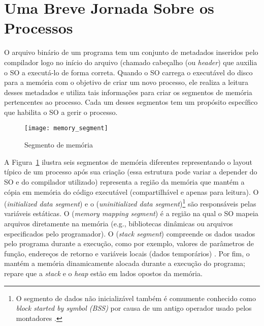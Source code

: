 \section{Uma Breve Jornada Sobre os Processos}
\label{sec:processos-e-threads}


O arquivo binário de um programa tem um conjunto de metadados inseridos pelo
compilador logo no início do arquivo (chamado cabeçalho (ou \textit{header})
que auxilia o SO a executá-lo de forma correta.  Quando o SO carrega o
executável do disco para a memória com o objetivo de criar um novo processo,
ele realiza a leitura desses metadados e utiliza tais informações para criar os
segmentos de memória pertencentes ao processo. Cada um desses segmentos tem um
propósito específico que habilita o SO a gerir o processo.

\begin{figure}[!h]
  \centering
  \texttt{[image: memory\_segment]} 
  \caption{Segmento de memória}
  \label{fig:memory_segment} 
\end{figure}

A Figura~\ref{fig:memory_segment} ilustra seis segmentos de memória diferentes
representando o layout típico de um processo após sua criação (essa estrutura
pode variar a depender do SO e do compilador utilizado) representa a região da
memória que mantém a cópia em memória do código executável (compartilhável e
apenas para leitura). O 
(\emph{initialized data segment}) e o  (\emph{uninitialized data segment})\footnote{O segmento de dados
não inicializável também é comumente conhecido como \emph{block started by
symbol (BSS)} por causa de um antigo operador usado pelos montadores
\citep{gdb}.} são responsáveis pelas variáveis estáticas. O
 (\emph{memory mapping
segment}) é a região na qual o SO mapeia arquivos diretamente na memória (e.g.,
bibliotecas dinâmicas ou arquivos especificados pelo programador). O
 (\emph{stack segment}) compreende os dados
usados pelo programa durante a execução, como por exemplo, valores de
parâmetros de função, endereços de retorno e variáveis locais (dados
temporários) \citep{silberschatz}. Por fim, o 
mantém a memória dinamicamente alocada durante a execução do programa; repare
que a \emph{stack} e o \emph{heap} estão em lados opostos da memória.

